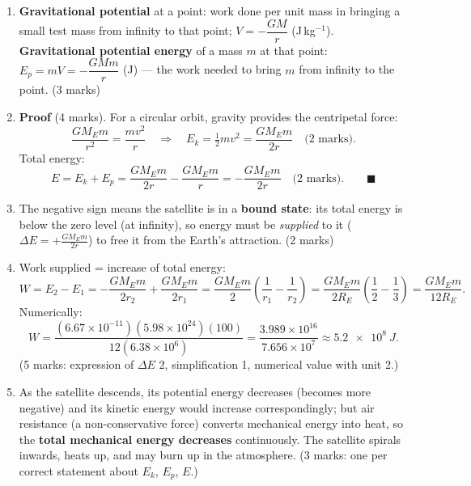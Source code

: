 \documentclass[11pt]{article}
\begin{document}
\begin{corrige}
\begin{enumerate}
\item \textbf{Gravitational potential} at a point: work done per unit mass in bringing a small test mass from infinity to that point; $V = -\dfrac{GM}{r}$ (J\,kg$^{-1}$). \textbf{Gravitational potential energy} of a mass $m$ at that point: $E_p = mV = -\dfrac{GMm}{r}$ (J) — the work needed to bring $m$ from infinity to the point. (3 marks)
\item \textbf{Proof} (4 marks). For a circular orbit, gravity provides the centripetal force:
\[
\frac{GM_E m}{r^2} = \frac{mv^2}{r}
\quad\Longrightarrow\quad
E_k = \tfrac12 mv^2 = \frac{GM_E m}{2r} \quad \text{(2 marks)}.
\]
Total energy:
\[
E = E_k + E_p = \frac{GM_E m}{2r} - \frac{GM_E m}{r} = -\frac{GM_E m}{2r} \quad \text{(2 marks)}. \qquad \blacksquare
\]
\item The negative sign means the satellite is in a \textbf{bound state}: its total energy is below the zero level (at infinity), so energy must be \emph{supplied} to it ($\Delta E = +\frac{GM_Em}{2r}$) to free it from the Earth's attraction. (2 marks)
\item Work supplied = increase of total energy:
\[
W = E_2 - E_1 = -\frac{GM_Em}{2r_2} + \frac{GM_Em}{2r_1}
= \frac{GM_Em}{2}\left(\frac{1}{r_1} - \frac{1}{r_2}\right)
= \frac{GM_Em}{2R_E}\left(\frac{1}{2} - \frac{1}{3}\right)
= \frac{GM_Em}{12R_E}.
\]
Numerically:
\[
W = \frac{(6.67\times10^{-11})(5.98\times10^{24})(100)}{12(6.38\times10^{6})}
= \frac{3.989\times10^{16}}{7.656\times10^{7}}
\approx \SI{5.2e8}{J}.
\]
(5 marks: expression of $\Delta E$ 2, simplification 1, numerical value with unit 2.)
\item As the satellite descends, its potential energy decreases (becomes more negative) and its kinetic energy would increase correspondingly; but air resistance (a non-conservative force) converts mechanical energy into heat, so the \textbf{total mechanical energy decreases} continuously. The satellite spirals inwards, heats up, and may burn up in the atmosphere. (3 marks: one per correct statement about $E_k$, $E_p$, $E$.)
\end{enumerate}
\end{corrige}
\end{document}
